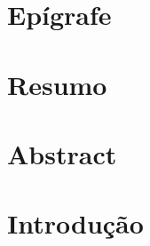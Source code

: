 \documentclass[12pt, a4paper, twoside]{article}
\numberwithin{equation}{subsection}
\def\blankpage{%
      \clearpage%
      \thispagestyle{empty}%
      \addtocounter{page}{-1}%
      \null%
      \clearpage}
\begin{document}
% 

 \section*{Epígrafe}

\newpage

% 

\section*{Resumo}

\newpage

% 

\section*{Abstract}

\newpage


\graphicspath{ {arquivos/graficos/} }
\graphicspath{{arquivo/imgs/}}

\listoftables
\newpage

\listoffigures
\newpage



\tableofcontents

\blankpage
\newpage

\section{Introdução}

\newpage
\end{document}
